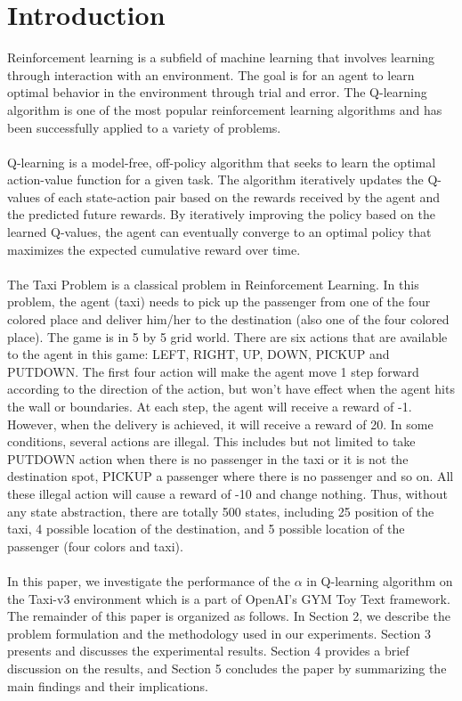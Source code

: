 \documentclass[conference]{IEEEtran}
\begin{document}
\section{Introduction}
Reinforcement learning is a subfield of machine learning that involves learning through interaction with an environment. The goal is for an agent to learn optimal behavior in the environment through trial and error. The Q-learning algorithm is one of the most popular reinforcement learning algorithms and has been successfully applied to a variety of problems. \\ \\ Q-learning is a model-free, off-policy algorithm that seeks to learn the optimal action-value function for a given task. The algorithm iteratively updates the Q-values of each state-action pair based on the rewards received by the agent and the predicted future rewards. By iteratively improving the policy based on the learned Q-values, the agent can eventually converge to an optimal policy that maximizes the expected cumulative reward over time. \\ \\ The Taxi Problem is a classical problem in Reinforcement Learning. In this problem, the agent (taxi) needs to pick up the passenger from one of the four colored place and deliver him/her to the destination (also one of the four colored place). The game is in 5 by 5 grid world. There are six actions that are available to the agent in this game: LEFT, RIGHT, UP, DOWN, PICKUP and PUTDOWN. The first four action will make the agent move 1 step forward according to the direction of the action, but won't have effect when the agent hits the wall or boundaries. At each step, the agent will receive a reward of -1. However, when the delivery is achieved, it will receive a reward of 20. In some conditions, several actions are illegal. This includes but not limited to take PUTDOWN action when there is no passenger in the taxi or it is not the destination spot, PICKUP a passenger where there is no passenger and so on. All these illegal action will cause a reward of -10 and change nothing. Thus, without any state abstraction, there are totally 500 states, including 25 position of the taxi, 4 possible location of the destination, and 5 possible location of the passenger (four colors and taxi). \\ \\ In this paper, we investigate the performance of the $\alpha$ in Q-learning algorithm on the Taxi-v3 environment which is a part of OpenAI's GYM Toy Text framework. The remainder of this paper is organized as follows. In Section 2, we describe the problem formulation and the methodology used in our experiments. Section 3 presents and discusses the experimental results. Section 4 provides a brief discussion on the results, and Section 5 concludes the paper by summarizing the main findings and their implications.
\end{document}
